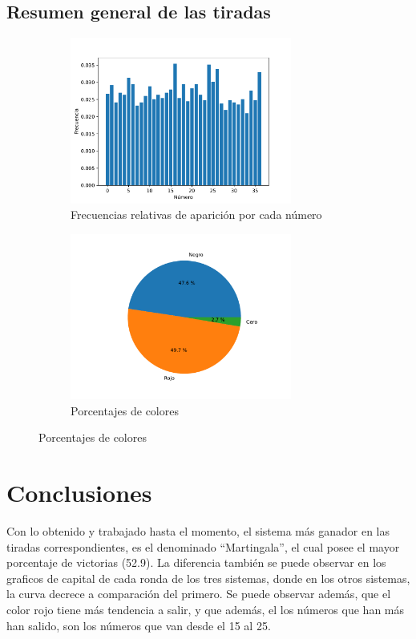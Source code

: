 \documentclass{article}
\begin{document}
  \subsection{Resumen general de las tiradas}
  \begin{figure}[H]
    \centering
    \begin{subfigure}{0.5\textwidth}
      \centering
      \includegraphics[width=0.8\textwidth]{generated/frec-aparicion.pdf}
      \caption{Frecuencias relativas de aparición por cada número}
    \end{subfigure}%
    \begin{subfigure}{0.5\textwidth}
      \centering
      \includegraphics[width=0.8\textwidth]{generated/resumen-colores.pdf}
      \caption{Porcentajes de colores}
    \end{subfigure}
  \end{figure}

\section{Conclusiones}

    Con lo obtenido y trabajado hasta el momento,
    el sistema más ganador en las tiradas correspondientes, es el denominado ``Martingala'',
    el cual posee el mayor porcentaje de victorias (52.9).
    La diferencia también se puede observar en los graficos de capital de cada ronda de los tres sistemas, donde
    en los otros sistemas, la curva decrece a comparación del primero. Se puede observar además, que el color rojo tiene más tendencia a salir,
    y que además, el los números que han más han salido, son los números que van desde el 15 al 25.
\end{document}
